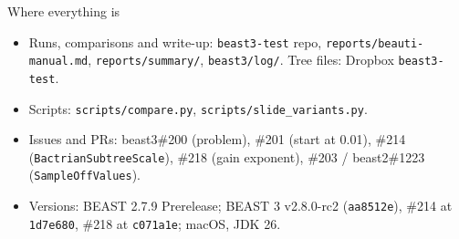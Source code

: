 \documentclass[aspectratio=169,11pt]{beamer}
\begin{document}
\begin{frame}{Where everything is}
  \small
  \begin{itemize}
    \item Runs, comparisons and write-up: \texttt{beast3-test} repo,
      \texttt{reports/beauti-manual.md}, \texttt{reports/summary/}, \texttt{beast3/log/}.
      Tree files: Dropbox \texttt{beast3-test}.
    \item Scripts: \texttt{scripts/compare.py}, \texttt{scripts/slide\_variants.py}.
    \item Issues and PRs: beast3\#200 (problem), \#201 (start at 0.01), \#214
      (\texttt{BactrianSubtreeScale}), \#218 (gain exponent), \#203 / beast2\#1223
      (\texttt{SampleOffValues}).
    \item Versions: BEAST 2.7.9 Prerelease; BEAST 3 v2.8.0-rc2 (\texttt{aa8512e}),
      \#214 at \texttt{1d7e680}, \#218 at \texttt{c071a1e}; macOS, JDK 26.
  \end{itemize}
\end{frame}
\end{document}
